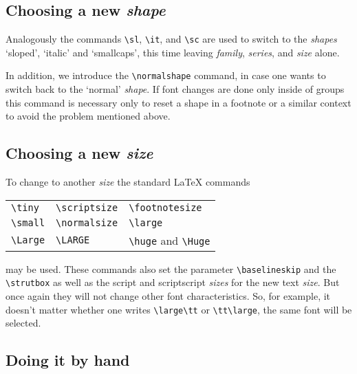  \subsection{Choosing a new {\em shape}}
 
 Analogously the commands \verb+\sl+, \verb+\it+, and \verb+\sc+ are
 used to switch to the {\em shapes\/} `sloped', `italic' and
 `smallcaps', this time leaving {\em family}, {\em series}, and {\em
 size\/} alone.
 
 In addition, we introduce the \verb+\normalshape+ command, in case
 one wants to switch back to the `normal' {\em shape}. If font changes
 are done only inside of groups this command is necessary only to
 reset a shape in a footnote or a similar context to avoid the
 problem mentioned above.
 
 
 \subsection{Choosing a new {\em size}}
 
 To change to another {\em size\/} the standard \LaTeX{} commands
 \begin{center}
   \begin{tabular}{lll}
      \verb+\tiny+  & \verb+\scriptsize+ & \verb+\footnotesize+ \\
      \verb+\small+ & \verb+\normalsize+ & \verb+\large+        \\
      \verb+\Large+ & \verb+\LARGE+ &      \verb+\huge+
                                           and \verb+\Huge+
   \end{tabular}
 \end{center}
 may be used. These commands also set the parameter
 \verb+\baselineskip+ and the \verb+\strutbox+ as well as the
 script and scriptscript {\em sizes\/} for
 the new text {\em size}.  But once again they will not change other
 font characteristics.  So, for example, it doesn't matter whether one
 writes
 \verb+\large\tt+ or \verb+\tt\large+, the same font will be selected.
 
 
 \subsection{Doing it by hand}
 
